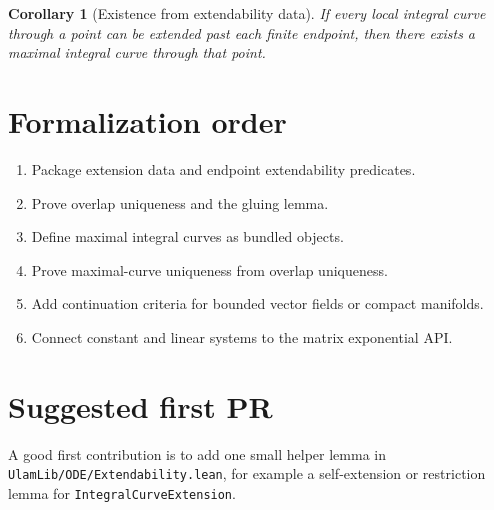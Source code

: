 \documentclass[11pt]{article}
\newtheorem{corollary}[definition]{Corollary}
\begin{document}
\begin{corollary}[Existence from extendability data]
\label{cor:existence-from-extendability}
If every local integral curve through a point can be extended past each finite
endpoint, then there exists a maximal integral curve through that point.
\end{corollary}

\section{Formalization order}

\begin{enumerate}
\item Package extension data and endpoint extendability predicates.
\item Prove overlap uniqueness and the gluing lemma.
\item Define maximal integral curves as bundled objects.
\item Prove maximal-curve uniqueness from overlap uniqueness.
\item Add continuation criteria for bounded vector fields or compact manifolds.
\item Connect constant and linear systems to the matrix exponential API.
\end{enumerate}

\section{Suggested first PR}

A good first contribution is to add one small helper lemma in
\texttt{UlamLib/ODE/Extendability.lean}, for example a self-extension or
restriction lemma for \texttt{IntegralCurveExtension}.
\end{document}
